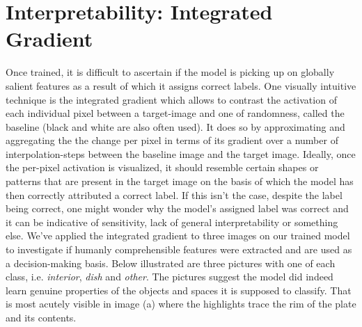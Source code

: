 \documentclass[11pt, oneside]{article}   	%
\begin{document}
\section{Interpretability: Integrated Gradient}
Once trained, it is difficult to ascertain if the model is picking up on globally salient features as a result of which it assigns correct labels. One visually intuitive technique is the integrated gradient which allows to contrast the activation of each individual pixel between a target-image and one of randomness, called the baseline (black and white are also often used).
It does so by approximating and aggregating the the change per pixel in terms of its gradient over a number of interpolation-steps between the baseline image and the target image.
\newline
Ideally, once the per-pixel activation is visualized, it should resemble certain shapes or patterns that are present in the target image on the basis of which the model has then correctly attributed a correct label. If this isn't the case, despite the label being correct, one might wonder why the model's assigned label was correct and it can be indicative of sensitivity, lack of general interpretability or something else.
\newline
We've applied the integrated gradient to three images on our trained model to investigate if humanly comprehensible features were extracted and are used as a decision-making basis. Below illustrated are three pictures with one of each class, i.e. \textit{interior}, \textit{dish} and \textit{other}. The pictures suggest the model did indeed learn genuine properties of the objects and spaces it is supposed to classify. That is most acutely visible in image (a) where the highlights trace the rim of the plate and its contents. 
\end{document}
